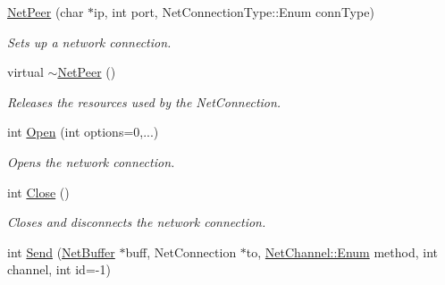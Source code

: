 \begin{DoxyCompactItemize}
\item 
\hypertarget{class_rhesus_1_1_messenger_1_1_net_peer_a7b3c18f79329e009a8d7551a1d2dc2d8}{\hyperlink{class_rhesus_1_1_messenger_1_1_net_peer_a7b3c18f79329e009a8d7551a1d2dc2d8}{Net\-Peer} (char $\ast$ip, int port, Net\-Connection\-Type\-::\-Enum conn\-Type)}\label{class_rhesus_1_1_messenger_1_1_net_peer_a7b3c18f79329e009a8d7551a1d2dc2d8}

\begin{DoxyCompactList}\small\item\em Sets up a network connection. \end{DoxyCompactList}\item 
\hypertarget{class_rhesus_1_1_messenger_1_1_net_peer_a1916bf3bc08d58f239a2c2b86a058f8d}{virtual \hyperlink{class_rhesus_1_1_messenger_1_1_net_peer_a1916bf3bc08d58f239a2c2b86a058f8d}{$\sim$\-Net\-Peer} ()}\label{class_rhesus_1_1_messenger_1_1_net_peer_a1916bf3bc08d58f239a2c2b86a058f8d}

\begin{DoxyCompactList}\small\item\em Releases the resources used by the Net\-Connection. \end{DoxyCompactList}\item 
\hypertarget{class_rhesus_1_1_messenger_1_1_net_peer_a69e9672c8b99af1c7addc1a18a65a0e1}{int \hyperlink{class_rhesus_1_1_messenger_1_1_net_peer_a69e9672c8b99af1c7addc1a18a65a0e1}{Open} (int options=0,...)}\label{class_rhesus_1_1_messenger_1_1_net_peer_a69e9672c8b99af1c7addc1a18a65a0e1}

\begin{DoxyCompactList}\small\item\em Opens the network connection. \end{DoxyCompactList}\item 
\hypertarget{class_rhesus_1_1_messenger_1_1_net_peer_a7f8d748a7c50d8e2bd4c1c70580db0e2}{int \hyperlink{class_rhesus_1_1_messenger_1_1_net_peer_a7f8d748a7c50d8e2bd4c1c70580db0e2}{Close} ()}\label{class_rhesus_1_1_messenger_1_1_net_peer_a7f8d748a7c50d8e2bd4c1c70580db0e2}

\begin{DoxyCompactList}\small\item\em Closes and disconnects the network connection. \end{DoxyCompactList}\item 
\hypertarget{class_rhesus_1_1_messenger_1_1_net_peer_a447aae01b13ac8f36b58da91e5ef8a73}{int \hyperlink{class_rhesus_1_1_messenger_1_1_net_peer_a447aae01b13ac8f36b58da91e5ef8a73}{Send} (\hyperlink{class_rhesus_1_1_messenger_1_1_net_buffer}{Net\-Buffer} $\ast$buff, Net\-Connection $\ast$to, \hyperlink{namespace_rhesus_1_1_messenger_1_1_net_channel_a5f3984e5aa9705ccb439f012018eb1e6}{Net\-Channel\-::\-Enum} method, int channel, int id=-\/1)}\label{class_rhesus_1_1_messenger_1_1_net_peer_a447aae01b13ac8f36b58da91e5ef8a73}


\end{DoxyCompactItemize}
